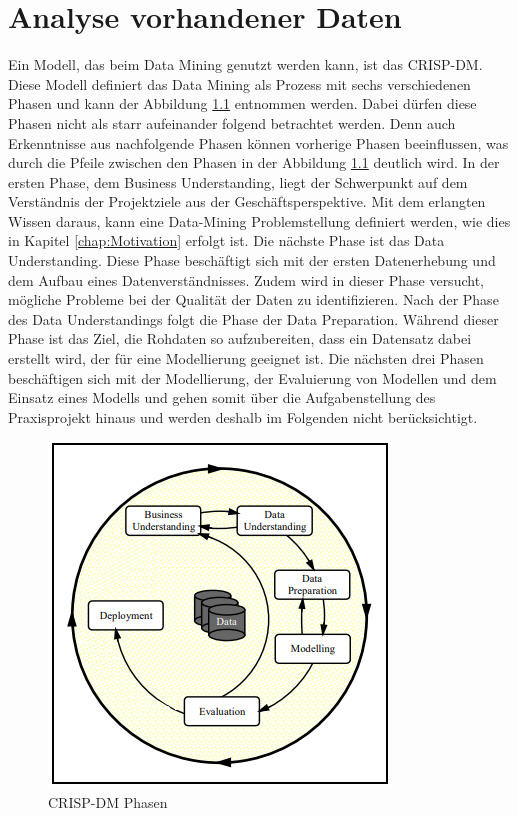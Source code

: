 \chapter{Analyse vorhandener Daten}
\label{chap:kapitel4}

Ein Modell, das beim Data Mining genutzt werden kann, ist das \ac*{CRISP-DM}. Diese Modell definiert das Data Mining als Prozess mit sechs verschiedenen Phasen und kann der 
Abbildung \ref*{fig:CRISP-DM} entnommen werden. Dabei dürfen diese Phasen nicht als starr aufeinander folgend betrachtet werden. Denn auch Erkenntnisse aus nachfolgende Phasen können vorherige Phasen
beeinflussen, was durch die Pfeile zwischen den Phasen in der Abbildung \ref*{fig:CRISP-DM} deutlich wird. In der ersten Phase, dem Business Understanding, liegt der Schwerpunkt auf dem Verständnis 
der Projektziele aus der Geschäftsperspektive. Mit dem erlangten Wissen daraus, kann eine Data-Mining Problemstellung definiert werden, wie dies in Kapitel \ref*{chap:Motivation} erfolgt ist. 
Die nächste Phase ist das Data Understanding. Diese Phase beschäftigt sich mit der ersten Datenerhebung und dem Aufbau eines Datenverständnisses. Zudem wird in dieser Phase versucht, mögliche Probleme 
bei der Qualität der Daten zu identifizieren. Nach der Phase des Data Understandings folgt die Phase der Data Preparation. Während dieser Phase ist das Ziel, die Rohdaten so aufzubereiten, dass ein 
Datensatz dabei erstellt wird, der für eine Modellierung geeignet ist. Die nächsten drei Phasen beschäftigen sich mit der Modellierung, der Evaluierung von Modellen und dem Einsatz 
eines Modells und gehen somit über die Aufgabenstellung des Praxisprojekt hinaus und werden deshalb im Folgenden nicht berücksichtigt. \cite[S.5-7]{q8}

\begin{figure}[H]
    \centering
    \includegraphics[]{abbildungen/CrispDM.PNG}
    \caption{\acs{CRISP-DM} Phasen \cite[S.5]{q8}}
    \label{fig:CRISP-DM}
\end{figure}


